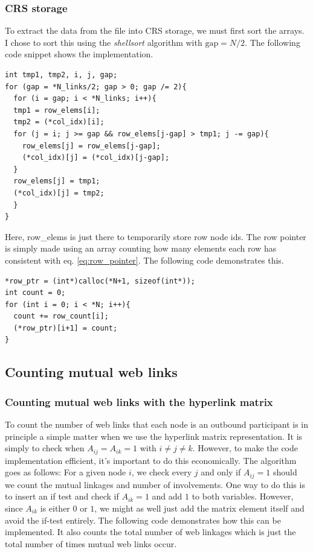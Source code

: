 \documentclass[english,notitlepage, reprint]{revtex4-1}  %
\begin{document}
\subsubsection{CRS storage}
To extract the data from the file into CRS storage, we must first sort the arrays. I chose to sort this using the \textit{shellsort} algorithm with $\text{gap} = N/2$. The following code snippet shows the implementation.

\begin{lstlisting}[style=customc]
int tmp1, tmp2, i, j, gap;
for (gap = *N_links/2; gap > 0; gap /= 2){
  for (i = gap; i < *N_links; i++){
  tmp1 = row_elems[i];
  tmp2 = (*col_idx)[i];
  for (j = i; j >= gap && row_elems[j-gap] > tmp1; j -= gap){
    row_elems[j] = row_elems[j-gap];
    (*col_idx)[j] = (*col_idx)[j-gap];
  }
  row_elems[j] = tmp1;
  (*col_idx)[j] = tmp2;
  }
}
\end{lstlisting}
Here, row\_elems is just there to temporarily store row node ids. The row pointer is simply made using an array counting how many elements each row has consistent with eq. \eqref{eq:row_pointer}. The following code demonstrates this.
\begin{lstlisting}[style=customc]
*row_ptr = (int*)calloc(*N+1, sizeof(int*));
int count = 0;
for (int i = 0; i < *N; i++){
  count += row_count[i];
  (*row_ptr)[i+1] = count;
}
\end{lstlisting}

\subsection*{Counting mutual web links}
\subsubsection{Counting mutual web links with the hyperlink matrix}
To count the number of web links that each node is an outbound participant is in principle a simple matter when we use the hyperlink matrix representation. It is simply to check when $A_{ij} = A_{ik} = 1$ with $i\neq j \neq k$. However, to make the code implementation efficient, it's important to do this economically. The algorithm goes as follows: For a given node $i$, we check every $j$ and only if $A_{ij} = 1$ should we count the mutual linkages and number of involvements. One way to do this is to insert an if test and check if $A_{ik} = 1$ and add $1$ to both variables. However, since $A_{ik}$ is either $0$ or $1$, we might as well just add the matrix element itself and avoid the if-test entirely. The following code demonstrates how this can be implemented. It also counts the total number of web linkages
which is just the total number of times mutual web links occur.
\end{document}
